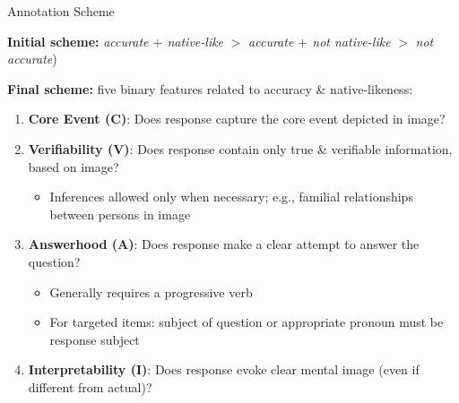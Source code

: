 \documentclass[final,t]{beamer}
\begin{document}
\begin{frame}{}
\begin{columns}[t]
\begin{column}{.33\linewidth}
\begin{block}{Annotation Scheme}
\begin{center}
\begin{minipage}{.85\textwidth}
\textbf{Initial scheme:} \textit{accurate $+$ native-like} $>$ \textit{accurate $+$ not native-like} $>$ \textit{not accurate})

\medskip

\textbf{Final scheme:} five binary features related to accuracy \&
native-likeness: 
\vspace{.5em}
\begin{enumerate}
\item \textbf{Core Event (C)}: Does response capture the core event depicted in image?
\vspace{.5em}
\item \textbf{Verifiability (V)}: Does response contain only true \& verifiable information, based on image? 
\begin{itemize}
\item Inferences allowed only when necessary; e.g., familial relationships between persons in image
\end{itemize}
\vspace{.5em}
\item \textbf{Answerhood (A)}: Does response make a clear attempt to answer the question?
\begin{itemize}
\item Generally requires a progressive verb
\item For targeted items: subject of question or appropriate pronoun must be response subject
\end{itemize}
\vspace{.5em}
\item \textbf{Interpretability (I)}: Does response evoke clear mental image (even if different from actual)? 

\end{enumerate}
\end{minipage}
\end{center}
\end{block}
\end{column}
\end{columns}
\end{frame}
\end{document}
